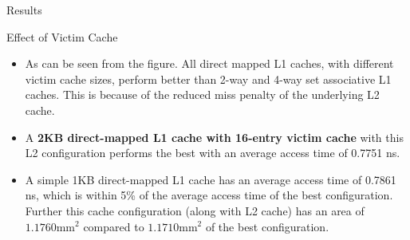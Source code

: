 \begin{section}{Results}
\begin{subsection}{Effect of Victim Cache}
        \begin{itemize}
        \item As can be seen from the figure. All direct mapped L1 caches, with different victim cache sizes, perform better than 2-way and 4-way set associative L1 caches. This is because of the reduced miss penalty of the underlying L2 cache.
        \item A \textbf{2KB direct-mapped L1 cache with 16-entry victim cache} with this L2 configuration performs the best with an average access time of 0.7751 ns.
        \item A simple 1KB direct-mapped L1 cache has an average access time of 0.7861 ns, which is within 5\% of the average access time of the best configuration. Further this cache configuration (along with L2 cache) has an area of $1.1760 \text{mm}^2$ compared to  $1.1710 \text{mm}^2$ of the best configuration. 
        \end{itemize}
        
    \end{subsection}

\end{section}